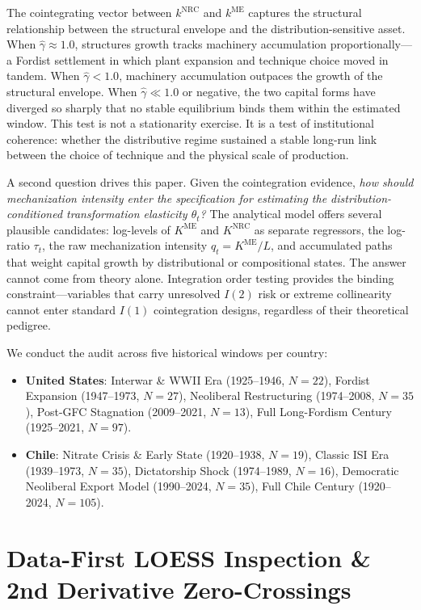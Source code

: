 \documentclass[11pt,a4paper]{article}
\begin{document}
The cointegrating vector between $k^{\text{NRC}}$ and $k^{\text{ME}}$ captures the structural relationship between the structural envelope and the distribution-sensitive asset. When $\hat{\gamma} \approx 1.0$, structures growth tracks machinery accumulation proportionally---a Fordist settlement in which plant expansion and technique choice moved in tandem. When $\hat{\gamma} < 1.0$, machinery accumulation outpaces the growth of the structural envelope. When $\hat{\gamma} \ll 1.0$ or negative, the two capital forms have diverged so sharply that no stable equilibrium binds them within the estimated window. This test is not a stationarity exercise. It is a test of institutional coherence: whether the distributive regime sustained a stable long-run link between the choice of technique and the physical scale of production.

A second question drives this paper. Given the cointegration evidence, \textit{how should mechanization intensity enter the specification for estimating the distribution-conditioned transformation elasticity $\theta_t$?} The analytical model offers several plausible candidates: log-levels of $K^{\text{ME}}$ and $K^{\text{NRC}}$ as separate regressors, the log-ratio $\tau_t$, the raw mechanization intensity $q_t = K^{\text{ME}}/L$, and accumulated paths that weight capital growth by distributional or compositional states. The answer cannot come from theory alone. Integration order testing provides the binding constraint---variables that carry unresolved $I(2)$ risk or extreme collinearity cannot enter standard $I(1)$ cointegration designs, regardless of their theoretical pedigree.

We conduct the audit across five historical windows per country:
\begin{itemize}
    \item \textbf{United States}: Interwar \& WWII Era (1925--1946, $N=22$), Fordist Expansion (1947--1973, $N=27$), Neoliberal Restructuring (1974--2008, $N=35$), Post-GFC Stagnation (2009--2021, $N=13$), Full Long-Fordism Century (1925--2021, $N=97$).
    \item \textbf{Chile}: Nitrate Crisis \& Early State (1920--1938, $N=19$), Classic ISI Era (1939--1973, $N=35$), Dictatorship Shock (1974--1989, $N=16$), Democratic Neoliberal Export Model (1990--2024, $N=35$), Full Chile Century (1920--2024, $N=105$).
\end{itemize}

\FloatBarrier
\section{Data-First LOESS Inspection \& 2nd Derivative Zero-Crossings}
\end{document}
